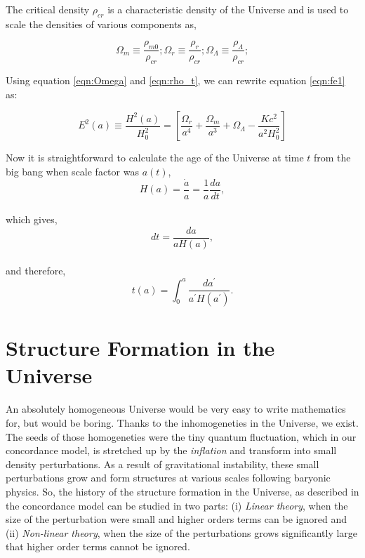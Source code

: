 The critical density $\rho_{cr}$ is a characteristic density of the Universe and is
used to scale the densities of various components as,

\begin{equation}
	\Omega_m \equiv \dfrac{\rho_{m0}}{\rho_{cr}};
	\Omega_r \equiv \dfrac{\rho_{r}}{\rho_{cr}};
	\Omega_{\Lambda} \equiv \dfrac{\rho_{\Lambda}}{\rho_{cr}};
	\label{eqn:Omega}
\end{equation}

Using equation \ref{eqn:Omega} and \ref{eqn:rho_t}, we can rewrite equation \ref{eqn:fe1} 
as:

\begin{equation}
	E^2(a) \equiv \dfrac{H^2(a)}{H_0^2} = \left[\dfrac{\Omega_r}{a^4}
	 + \dfrac{\Omega_m}{a^3} +
	 \Omega_{\Lambda} - \dfrac{Kc^2}{a^2H_0^2}  \right]
\end{equation}

Now it is straightforward to calculate the age of the Universe at time $t$ from the big bang
when scale factor was $a(t)$,
\begin{equation}
	H(a) = \dfrac{\dot{a}}{a} = \dfrac{1}{a} \dfrac{da}{dt},
\end{equation}
\\
which gives,
\begin{equation}
	dt = \dfrac{da}{aH(a)},
\end{equation}
\\
and therefore,
\begin{equation}
	t(a) = \int_0^a \dfrac{da^{\prime}}{a^{\prime}H(a^{\prime})}.
\end{equation}

\clearpage
\section{Structure Formation in the Universe}

An absolutely homogeneous Universe would be very easy to write mathematics for, but 
would be boring. Thanks to the inhomogeneties in the Universe, we exist. The seeds
of those homogeneties were the tiny quantum fluctuation, which in our concordance 
model, is stretched up by the {\it inflation} and transform into small density
perturbations. As a result of gravitational instability, these small perturbations 
grow and form structures at various scales following baryonic physics. 
So, the history of the  structure formation in the Universe, as described in the 
concordance model can be studied in two parts: (i) {\it Linear theory}, when
the size of the perturbation were small and higher orders terms can be ignored and 
(ii) {\it Non-linear theory}, when the size of the perturbations grows significantly
large that higher order terms cannot be ignored.

